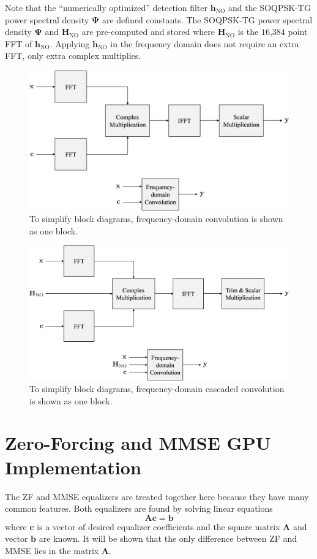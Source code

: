 Note that the ``numerically optimized'' detection filter $\mathbf{h}_\text{NO}$ and the SOQPSK-TG power spectral density $\mathbf{\Psi}$ are defined constants.
The SOQPSK-TG power spectral density $\mathbf{\Psi}$ and $\mathbf{H}_\text{NO}$ are pre-computed and stored where $\mathbf{H}_\text{NO}$ is the $16$,$384$ point FFT of $\mathbf{h}_\text{NO}$.
Applying $\mathbf{h}_\text{NO}$ in the frequency domain does not require an extra FFT, only extra complex multiplies.
\begin{figure}
	\centering\includegraphics[width=10.28in/100*55]{figures/eq_GPUimplementation/Conv2.pdf}
	\caption{To simplify block diagrams, frequency-domain convolution is shown as one block.}
	\label{fig:Conv2}
\end{figure}
\begin{figure}
	\centering\includegraphics[width=10.28in/100*55]{figures/eq_GPUimplementation/Conv3.pdf}
	\caption{To simplify block diagrams, frequency-domain cascaded convolution is shown as one block.}
	\label{fig:Conv3}
\end{figure}

\clearpage
\section{Zero-Forcing and MMSE GPU Implementation}
The ZF and MMSE equalizers are treated together here because they have many common features.
Both equalizers are found by solving linear equations
\begin{equation}
\mathbf{A}\mathbf{c} = \mathbf{b}
\end{equation}
where $\mathbf{c}$ is a vector of desired equalizer coefficients
and the square matrix $\mathbf{A}$ and vector $\mathbf{b}$ are known.
It will be shown that the only difference between ZF and MMSE lies in the matrix $\mathbf{A}$.

